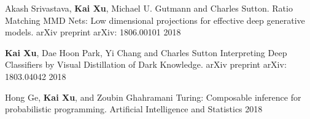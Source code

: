


\begin{cvpublications}

  \cvpublication
    {Akash Srivastava, \textbf{Kai Xu}, Michael U. Gutmann and Charles Sutton.} %
    {Ratio Matching MMD Nets: Low dimensional projections for effective deep generative models.} %
    {arXiv preprint arXiv: 1806.00101} %
    {2018} %

  \cvpublication
    {\textbf{Kai Xu}, Dae Hoon Park, Yi Chang and Charles Sutton} %
    {Interpreting Deep Classifiers by Visual Distillation of Dark Knowledge.} %
    {arXiv preprint arXiv: 1803.04042} %
    {2018} %

  \cvpublication
    {Hong Ge, \textbf{Kai Xu}, and Zoubin Ghahramani} %
    {Turing: Composable inference for probabilistic programming.} %
    {Artificial Intelligence and Statistics} %
    {2018} %


\end{cvpublications}
